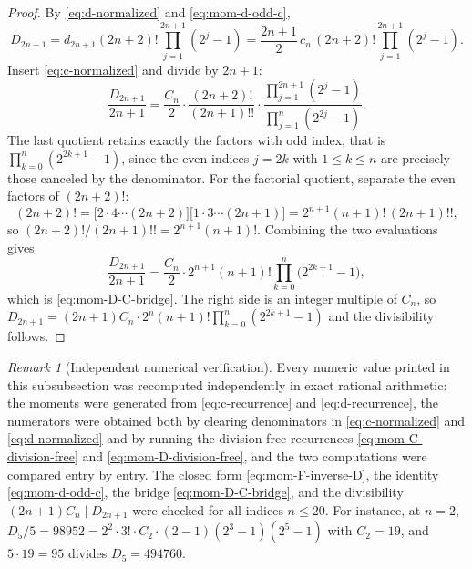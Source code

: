 \documentclass[11pt,oneside]{article}
\theoremstyle{definition}
\theoremstyle{remark}
\newtheorem{remark}[theorem]{Remark}
\begin{document}
\begin{proof}
By \eqref{eq:d-normalized} and \eqref{eq:mom-d-odd-c},
\begin{equation*}
 D_{2n+1}=d_{2n+1}(2n+2)!\prod_{j=1}^{2n+1}(2^j-1)
 =\frac{2n+1}{2}\,c_n\,(2n+2)!\prod_{j=1}^{2n+1}(2^j-1).
\end{equation*}
Insert \eqref{eq:c-normalized} and divide by $2n+1$:
\begin{equation*}
 \frac{D_{2n+1}}{2n+1}
 =\frac{C_n}{2}\cdot\frac{(2n+2)!}{(2n+1)!!}
 \cdot\frac{\prod_{j=1}^{2n+1}(2^j-1)}{\prod_{j=1}^{n}(2^{2j}-1)}.
\end{equation*}
The last quotient retains exactly the factors with odd index, that is
$\prod_{k=0}^{n}(2^{2k+1}-1)$, since the even indices $j=2k$ with $1\le k\le n$ are precisely
those canceled by the denominator.  For the factorial quotient, separate the even factors of
$(2n+2)!$:
\begin{equation*}
 (2n+2)!=\bigl[2\cdot4\cdots(2n+2)\bigr]\bigl[1\cdot3\cdots(2n+1)\bigr]
 =2^{n+1}(n+1)!\,(2n+1)!!,
\end{equation*}
so $(2n+2)!/(2n+1)!!=2^{n+1}(n+1)!$.  Combining the two evaluations gives
\begin{equation*}
 \frac{D_{2n+1}}{2n+1}
 =\frac{C_n}{2}\cdot2^{n+1}(n+1)!\prod_{k=0}^{n}\bigl(2^{2k+1}-1\bigr),
\end{equation*}
which is \eqref{eq:mom-D-C-bridge}.  The right side is an integer multiple of $C_n$, so
$D_{2n+1}=(2n+1)C_n\cdot2^n(n+1)!\prod_{k=0}^{n}(2^{2k+1}-1)$ and the divisibility follows.
\end{proof}

\begin{remark}[Independent numerical verification]          \label{rem:mom-numerator-check}
Every numeric value printed in this subsubsection was recomputed independently in exact
rational arithmetic: the moments were generated from \eqref{eq:c-recurrence} and
\eqref{eq:d-recurrence}, the numerators were obtained both by clearing denominators in
\eqref{eq:c-normalized} and \eqref{eq:d-normalized} and by running the division-free
recurrences \eqref{eq:mom-C-division-free} and \eqref{eq:mom-D-division-free}, and the two
computations were compared entry by entry.  The closed form \eqref{eq:mom-F-inverse-D}, the
identity \eqref{eq:mom-d-odd-c}, the bridge \eqref{eq:mom-D-C-bridge}, and the divisibility
$(2n+1)C_n\mid D_{2n+1}$ were checked for all indices $n\le20$.  For instance, at $n=2$,
$D_5/5=98952=2^2\cdot3!\cdot C_2\cdot(2-1)(2^3-1)(2^5-1)$ with $C_2=19$, and
$5\cdot19=95$ divides $D_5=494760$.
\end{remark}
\end{document}
